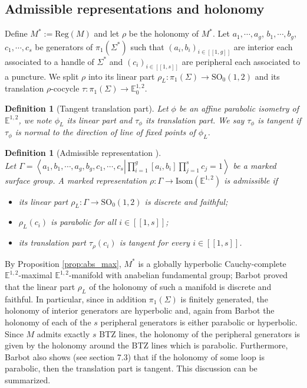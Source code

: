 \documentclass[a4paper,12pt]{article}
\def\GG{\SO_0(1,2)}
\def\isom{Isom}
\def\lsem{[\![}
\def\rsem{]\!]}
\def\E{\mathbf E}
\def\SO{\mathrm{SO}}
\def\E{\mathbb{E}}
\newcommand{\mass}[1]{{\mathbb E}^{1,2}_{#1}}
\def\isom{\mathrm{Isom}}
\def\Reg{\mathrm{Reg}}
\def\reg{\Reg}
\newtheorem{defou}[lemou]{Definition}    %
\begin{document}
\subsection{Admissible representations and holonomy}
\label{sec:admissible_rep}

Define $M^*:=\reg(M)$ and let $\rho$ be the holonomy of $M^*$. Let $a_1,\cdots,a_g$, $b_1, \cdots,b_g$, $c_1,\cdots,c_s$ 
be generators of $\pi_1(\Sigma^*)$  such that $(a_i,b_i)_{i\in \lsem 1,g\rsem}$ are interior each associated to a handle of $\Sigma^*$ and $(c_i)_{i\in \lsem 1,s\rsem}$ are peripheral each associated to a puncture. 
We split $\rho$  into its linear part $\rho_L: \pi_1(\Sigma)\rightarrow \GG$ and its translation $\rho$-cocycle $\tau: \pi_1(\Sigma)\rightarrow \mass{0}$.

\begin{defou}[Tangent translation part]\label{btzdef:tangent_translation_part} Let $\phi$ be an affine parabolic isometry of $\mass{}$, we note $\phi_L$ its linear part and $\tau_\phi$ its translation part.
We say $\tau_\phi$ is tangent if $\tau_\phi$ is normal to the direction of line of fixed points of $\phi_L$.
 
\end{defou}
\begin{defou}[Admissible representation ]\label{btzdef:admissible_representation} \ \\ Let $\Gamma = \left\langle a_1,b_1,\cdots,a_g,b_g, c_1,\cdots,c_s \left |  \prod_{i=1}^g [a_i,b_i] \prod_{j=1}^s c_j=1\right.\right\rangle$
be a marked surface group.
A marked representation $\rho:\Gamma \rightarrow \isom(\E^{1,2})$ is admissible if 
\begin{itemize}
 \item its linear part $\rho_L: \Gamma \rightarrow \GG$ is discrete and faithful;
 \item $\rho_L(c_i)$ is parabolic for all $i\in \lsem 1,s\rsem$;
 \item its translation part $\tau_\rho(c_i)$ is tangent for every $i\in \lsem 1,s\rsem$.
\end{itemize}
\end{defou}

By Proposition \ref{prop:abs_max}, $M^*$ is a globally hyperbolic Cauchy-complete $\mass{}$-maximal $\mass{}$-manifold with anabelian fundamental group; Barbot \cite{barbot_globally_2004} proved that the linear part $\rho_L$ of the holonomy of such a manifold is discrete and faithful. In particular, since in addition $\pi_1(\Sigma)$ is finitely generated, the holonomy of interior generators are hyperbolic \cite{MR1177168} and, again from Barbot \cite{barbot_globally_2004} the holonomy of each of the $s$ peripheral generators is either parabolic or hyperbolic.
 Since $M$ admits exactly $s$ BTZ lines, the holonomy of the peripheral generators is given by the holonomy around the BTZ lines which is parabolic. Furthermore, Barbot also shows (see \cite{barbot_globally_2004}  section 7.3) that if the holonomy of some loop is parabolic, then  the translation part is tangent. 
This discussion can be summarized.
\end{document}
